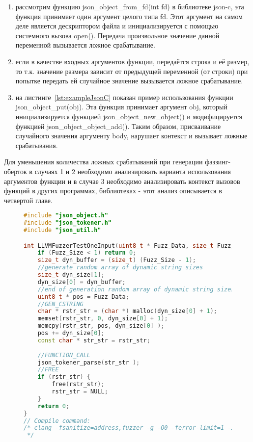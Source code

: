\begin{enumerate}
    \item рассмотрим функцию json\_object\_from\_fd(int fd) в библиотеке json-c, эта функция принимает один аргумент целого типа fd. Этот аргумент на самом деле является дескриптором файла и инициализируется с помощью системного вызова open(). Передача произвольное значение данной переменной вызывается ложное срабатывание.
    \item если в качестве входных аргументов функции, передаётся строка и её размер, то т.к. значение размера зависит от предыдущей переменной (от строки) при попытке передать ей случайное значение вызывается ложное срабатывание.
    \item на листинге~\cref{lst:exampleJsonC} показан пример использования функции json\_object\_put(obj).  Эта функция принимает аргумент obj, который инициализируется функцией json\_object\_new\_object() и модифицируется функцией json\_object\_object\_add(). Таким образом, присваивание случайного значения аргументу body, нарушает контекст и вызывает ложные срабатывания.
\end{enumerate}

Для уменьшения количества ложных срабатываний при генерации фаззинг-оберток в случаях 1 и 2 необходимо анализировать варианта использования аргументов функции и в случае 3 необходимо анализировать контекст вызовов функций в других программах, библиотеках - этот анализ описывается в четвертой главе.

\begin{figure}[thp]
\begin{lstlisting}[language=C++,frame=single,caption={Результат метода генерации фаззинг-обертки в условиях отсутствия контекста использования},label=lst:wrapperNocontext]
#include "json_object.h"
#include "json_tokener.h"
#include "json_util.h"

int LLVMFuzzerTestOneInput(uint8_t * Fuzz_Data, size_t Fuzz_Size){
    if (Fuzz_Size < 1) return 0;
    size_t dyn_buffer = (size_t) (Fuzz_Size - 1);
    //generate random array of dynamic string sizes
    size_t dyn_size[1];
    dyn_size[0] = dyn_buffer;
    //end of generation random array of dynamic string sizes
    uint8_t * pos = Fuzz_Data;
    //GEN_CSTRING
    char * rstr_str = (char *) malloc(dyn_size[0] + 1);
    memset(rstr_str, 0, dyn_size[0] + 1);
    memcpy(rstr_str, pos, dyn_size[0] );
    pos += dyn_size[0];
    const char * str_str = rstr_str;
    
    //FUNCTION_CALL
    json_tokener_parse(str_str );
    //FREE
    if (rstr_str) {
        free(rstr_str);
        rstr_str = NULL;
    }
    return 0;
}
// Compile command:
/* clang -fsanitize=address,fuzzer -g -O0 -ferror-limit=1 -I. -I./.futag-build/  ./futag-drivers/json_tokener_parse1.c -o ./futag-drivers/json_tokener_parse1.out -Wl,--start-group ./.futag-build/libjson-c.a -Wl,--end-group 
 */
\end{lstlisting}
\end{figure}

